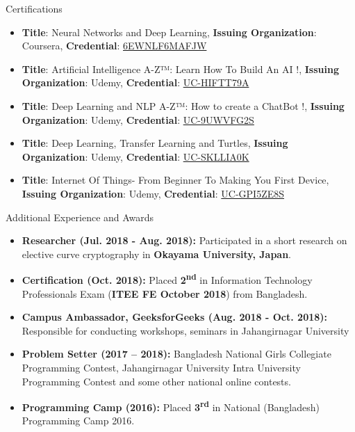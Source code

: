 \documentclass[]{mcdowellcv}
\begin{document}
	\begin{cvsection}{Certifications}
		\begin{cvsubsection}{}{}{}	
		       \vspace{2.1pt}
			\begin{itemize}
			  \item \textbf{Title}: Neural Networks and Deep Learning, \textbf{Issuing Organization}: Coursera, \textbf{Credential}:  \href{https://www.coursera.org/account/accomplishments/certificate/6EWNLF6MAFJW}{6EWNLF6MAFJW}
			  \item \textbf{Title}:  Artificial Intelligence A-Z™: Learn How To Build An AI !, \textbf{Issuing Organization}: Udemy, \textbf{Credential}:  \href{http://ude.my/UC-HIFTT79A}{UC-HIFTT79A}
			  \item \textbf{Title}:  Deep Learning and NLP A-Z™: How to create a ChatBot !, \textbf{Issuing Organization}: Udemy, \textbf{Credential}:  \href{http://ude.my/UC-9UWVFG2S}{UC-9UWVFG2S}
			  \item \textbf{Title}: Deep Learning, Transfer Learning and Turtles, \textbf{Issuing Organization}: Udemy, \textbf{Credential}:  \href{http://ude.my/UC-SKLLIA0K}{UC-SKLLIA0K}
			   \item \textbf{Title}: Internet Of Things- From Beginner To Making You First Device, \textbf{Issuing Organization}: Udemy, \textbf{Credential}:  \href{http://ude.my/UC-GPI5ZE8S}{UC-GPI5ZE8S}
			\end{itemize}
		\end{cvsubsection}
	\end{cvsection}
	\begin{cvsection}{Additional Experience and Awards}
		\begin{cvsubsection}{}{}{}	
		       \vspace{2.1pt}
			\begin{itemize}
			  \item \textbf{Researcher (Jul. 2018 - Aug. 2018):} Participated in a short research on elective curve cryptography in \textbf{Okayama University, Japan}.
			  \item \textbf{Certification (Oct. 2018):}  Placed \textbf{2\textsuperscript{nd}} in Information Technology Professionals Exam (\textbf{ITEE FE October 2018}) from Bangladesh.
			  \item \textbf{Campus Ambassador, GeeksforGeeks (Aug. 2018 - Oct. 2018):} Responsible for conducting workshops, seminars in Jahangirnagar University
			  \item \textbf{Problem Setter (2017 – 2018):} Bangladesh National Girls Collegiate Programming Contest, Jahangirnagar University Intra University Programming Contest and some other national online contests.
			  \item \textbf{Programming Camp (2016):} Placed \textbf{3\textsuperscript{rd}} in National (Bangladesh) Programming Camp 2016.
			\end{itemize}
		\end{cvsubsection}
	\end{cvsection}
	
\end{document}
